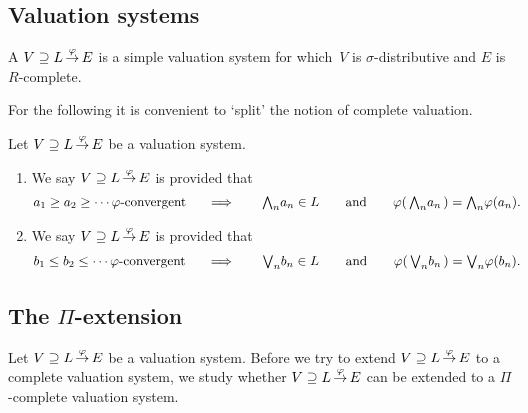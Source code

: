 \documentclass[main.tex]{subfiles}
\begin{document}
\subsection{Valuation systems}
\begin{dfn}
\label{D:system}
A  $V \supseteq L\,\smash{\stackrel{\varphi}{\rightarrow}}\,E$
is a simple valuation system
for which~$V$ is $\sigma$-distributive
and $E$ is $R$-complete.
\end{dfn}

For the following it is convenient to `split' the notion
of complete valuation.
\begin{dfn}
\label{D:system-complete2}
Let $V \supseteq L\,\smash{\stackrel{\varphi}{\rightarrow}}\,E$ be
a valuation system.
\begin{enumerate}
\item
\label{D:system-complete2-pi}
We say $V \supseteq L\,\smash{\stackrel{\varphi}{\rightarrow}}\,E$ is 
provided that
\begin{alignat*}{5}
a_1 \geq a_2 \geq \dotsb \text{$\varphi$-convergent }
  \quad &\implies \quad 
  & \textstyle{\bigwedge}_n a_n &\in L\quad 
  &&\text{and}\quad
  &\varphi(\,\textstyle{\bigwedge}_n a_n\,) &= \textstyle{\bigwedge}_n \varphi(a_n). 
\end{alignat*}
\item
We say $V \supseteq L\,\smash{\stackrel{\varphi}{\rightarrow}}\,E$ is 
provided that
\begin{alignat*}{5}
b_1 \leq b_2 \leq \dotsb \text{$\varphi$-convergent }
  \quad &\implies \quad 
  & \textstyle{\bigvee}_n b_n &\in L\quad 
  &&\text{and}\quad
  &\varphi(\,\textstyle{\bigvee}_n b_n\,) &= \textstyle{\bigvee}_n \varphi(b_n). 
\end{alignat*}

\end{enumerate}
\end{dfn}

%
%

\subsection{The $\Pi$-extension}
Let $V \supseteq L\,\smash{\stackrel{\varphi}{\rightarrow}}\,E$ be a valuation system.
Before we try to extend $V \supseteq L\,\smash{\stackrel{\varphi}{\rightarrow}}\,E$ to a complete
valuation system, 
we study whether $V \supseteq L\,\smash{\stackrel{\varphi}{\rightarrow}}\,E$
can be extended to a $\Pi$-complete valuation system.
\end{document}
